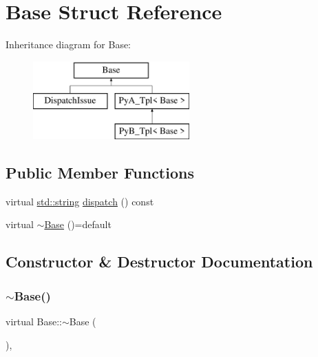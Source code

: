 \hypertarget{struct_base}{}\section{Base Struct Reference}
\label{struct_base}
Inheritance diagram for Base\+:\begin{figure}[H]
\begin{center}
\leavevmode
\includegraphics[height=3.000000cm]{struct_base}
\end{center}
\end{figure}
\subsection*{Public Member Functions}
\begin{DoxyCompactItemize}
\item 
virtual \mbox{\hyperlink{_s_d_l__opengl__glext_8h_ab4ccfaa8ab0e1afaae94dc96ef52dde1}{std\+::string}} \mbox{\hyperlink{struct_base_a88a122105aa11d0f4e2113beb2a8f669}{dispatch}} () const
\item 
virtual \mbox{\hyperlink{struct_base_a306fb25541331080645a716286357ef9}{$\sim$\+Base}} ()=default
\end{DoxyCompactItemize}


\subsection{Constructor \& Destructor Documentation}
\mbox{\label{struct_base_a306fb25541331080645a716286357ef9}} 
\subsubsection{\texorpdfstring{$\sim$Base()}{~Base()}}
{\footnotesize\ttfamily virtual Base\+::$\sim$\+Base (\begin{DoxyParamCaption}{ }\end{DoxyParamCaption})\hspace{0.3cm}{\ttfamily [virtual]}, {\ttfamily [default]}}




